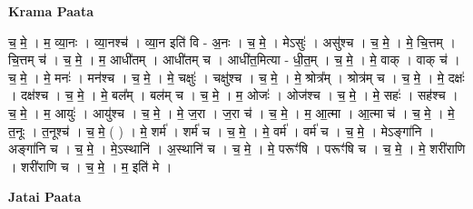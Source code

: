 \documentclass[17pt]{extarticle}
\begin{document}
\textbf{Krama Paata} \newline

च॒ मे॒ । म॒ व्या॒नः । व्या॒नश्च॑ । व्या॒न इति॑ वि - अ॒नः । च॒ मे॒ । मेऽसुः॑ । असु॑श्च । च॒ मे॒ । मे॒ चि॒त्तम् । चि॒त्तम् च॑ । च॒ मे॒ । म॒ आधी॑तम् । आधी॑तम् च । आधी॑त॒मित्या - धी॒त॒म् । च॒ मे॒ । मे॒ वाक् । वाक् च॑ । च॒ मे॒ । मे॒ मनः॑ । मन॑श्च । च॒ मे॒ । मे॒ चक्षुः॑ । चक्षु॑श्च । च॒ मे॒ । मे॒ श्रोत्र᳚म् । श्रोत्र॑म् च । च॒ मे॒ । मे॒ दक्षः॑ । दक्ष॑श्च । च॒ मे॒ । मे॒ बल᳚म् । बल॑म् च । च॒ मे॒ । म॒ ओजः॑ । ओज॑श्च । च॒ मे॒ । मे॒ सहः॑ । सह॑श्च । च॒ मे॒ । म॒ आयुः॑ । आयु॑श्च । च॒ मे॒ । मे॒ ज॒रा । ज॒रा च॑ । च॒ मे॒ । म॒ आ॒त्मा । आ॒त्मा च॑ । च॒ मे॒ । मे॒ त॒नूः । त॒नूश्च॑ । च॒ मे॒ ( ) । मे॒ शर्म॑ । शर्म॑ च । च॒ मे॒ । मे॒ वर्म॑ । वर्म॑ च । च॒ मे॒ । मेऽङ्गा॑नि । अङ्गा॑नि च । च॒ मे॒ । मे॒ऽस्थानि॑ । अ॒स्थानि॑ च । च॒ मे॒ । मे॒ परूꣳ॑षि । परूꣳ॑षि च । च॒ मे॒ । मे॒ शरी॑राणि । शरी॑राणि च । च॒ मे॒ । 
म॒ इति॑ मे । \newline

\textbf{Jatai Paata} \newline
\end{document}
